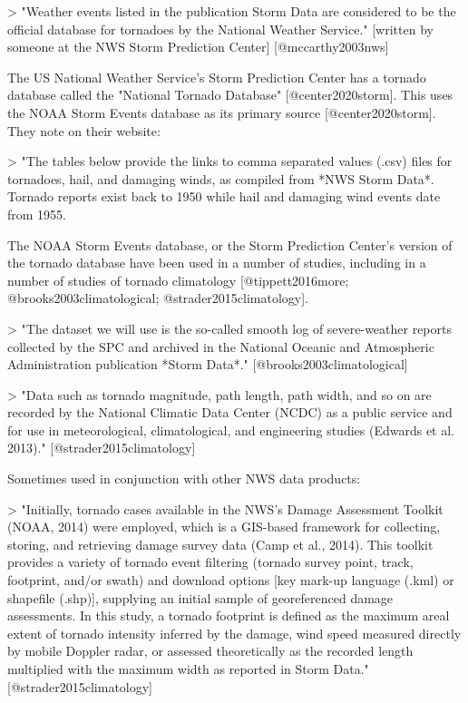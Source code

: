 > "Weather events listed in the publication Storm Data are considered to be
the official database for tornadoes by the National Weather Service." 
[written by someone at the NWS Storm Prediction Center] [@mccarthy2003nws]

The US National Weather Service's Storm Prediction Center has a tornado database
called the "National Tornado Database" [@center2020storm]. This uses the NOAA
Storm Events database as its primary source [@center2020storm]. They note on their
website: 

> "The tables below provide the links to comma separated values (.csv) files for
tornadoes, hail, and damaging winds, as compiled from *NWS Storm Data*. Tornado 
reports exist back to 1950 while hail and damaging wind events date from 1955.


The NOAA Storm Events database, or the Storm Prediction Center's version of the
tornado database have been used in a number of studies, including in a number of
studies of tornado climatology [@tippett2016more; @brooks2003climatological;
@strader2015climatology].

> "The dataset we will use is the so-called smooth log of severe-weather reports
collected by the SPC and archived in the National Oceanic and Atmospheric 
Administration publication *Storm Data*." [@brooks2003climatological]

> "Data such as tornado magnitude, path length, path width, and so on are
recorded by the National Climatic Data Center (NCDC) as a public service and for
use in meteorological, climatological, and engineering studies (Edwards et al.
2013)." [@strader2015climatology]

Sometimes used in conjunction with other NWS data products: 

> "Initially, tornado cases available in the NWS's Damage Assessment Toolkit
(NOAA, 2014) were employed, which is a GIS-based framework for collecting,
storing, and retrieving damage survey data (Camp et al., 2014). This toolkit
provides a variety of tornado event filtering (tornado survey point, track,
footprint, and/or swath) and download options [key mark-up language (.kml) or
shapefile (.shp)], supplying an initial sample of georeferenced damage
assessments. In this study, a tornado footprint is defined as the maximum areal
extent of tornado intensity inferred by the damage, wind speed measured directly
by mobile Doppler radar, or assessed theoretically as the recorded length
multiplied with the maximum width as reported in Storm Data."
[@strader2015climatology]

